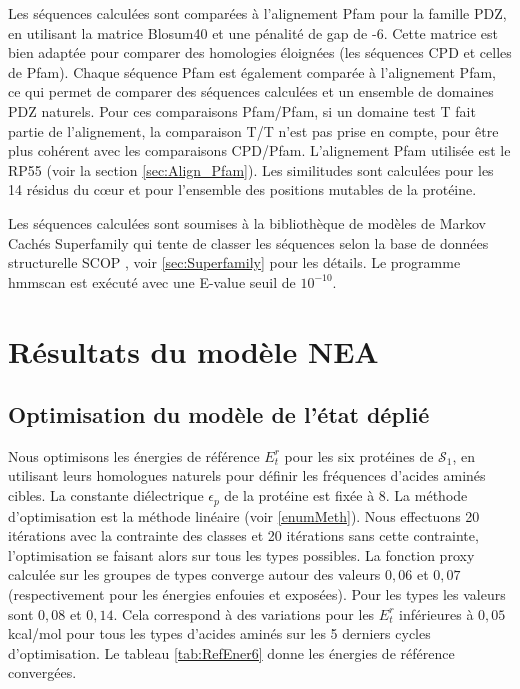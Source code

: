 Les séquences calculées sont comparées à l'alignement Pfam pour la famille PDZ, en utilisant la matrice Blosum40 et une pénalité de gap de -6. Cette matrice est bien adaptée pour comparer des homologies éloignées (les séquences CPD et celles de Pfam). Chaque séquence Pfam est également comparée à l'alignement Pfam, ce qui permet de comparer des séquences calculées et un ensemble de domaines PDZ naturels. Pour ces comparaisons Pfam/Pfam, si un domaine test T fait partie de l'alignement, la comparaison T/T n'est pas prise en compte, pour être plus cohérent avec les comparaisons CPD/Pfam. L'alignement Pfam utilisée est le \og RP55 \fg (voir la section \ref{sec:Align_Pfam}). Les similitudes sont calculées pour les 14 résidus du cœur et pour l'ensemble des positions mutables de la protéine.

Les séquences calculées sont soumises à la bibliothèque de modèles de Markov Cachés Superfamily \cite{Gough01, Wilson07}  qui tente de classer les séquences selon la base de données structurelle SCOP \cite{Andreeva04}, voir \ref{sec:Superfamily} pour les détails. Le programme hmmscan est exécuté avec une E-value seuil de $10^{-10}$. 

\section {Résultats du modèle NEA} 
\label{sectionNEA} 
\subsection{Optimisation du modèle de l'état déplié}

Nous optimisons les énergies de référence $E_t^r$ pour les six protéines de $\mathcal{S}_1$, en utilisant leurs homologues naturels pour définir les fréquences d'acides aminés cibles. La constante diélectrique $\epsilon_p$ de la protéine est fixée à $8$. La méthode d'optimisation est la méthode linéaire (voir \ref{enumMeth}). Nous effectuons 20 itérations avec la contrainte des classes et 20 itérations sans cette contrainte, l'optimisation se faisant alors sur tous les types possibles. La fonction proxy calculée sur les groupes de types converge autour des valeurs $0,06$ et $0,07$ (respectivement pour les énergies enfouies et exposées). Pour les types les valeurs sont $0,08$ et $0,14$. Cela correspond à des variations  pour les $E_t^r$ inférieures à $0,05$ kcal/mol pour tous les types d'acides aminés sur les 5 derniers cycles d'optimisation. Le tableau \ref{tab:RefEner6} donne les énergies de référence convergées.

